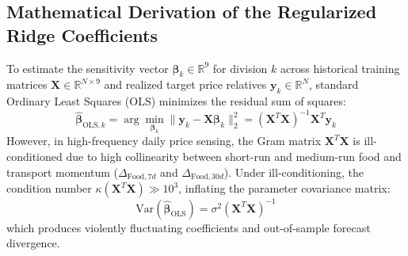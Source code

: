 \subsection{Mathematical Derivation of the Regularized Ridge Coefficients}
\hs To estimate the sensitivity vector $\boldsymbol{\beta}_k \in \mathbb{R}^9$ for division $k$ across historical training matrices $\mathbf{X} \in \mathbb{R}^{N \times 9}$ and realized target price relatives $\mathbf{y}_k \in \mathbb{R}^N$, standard Ordinary Least Squares (OLS) minimizes the residual sum of squares:
\begin{equation}
    \hat{\boldsymbol{\beta}}_{\text{OLS}, k} = \arg\min_{\boldsymbol{\beta}_k} \|\mathbf{y}_k - \mathbf{X}\boldsymbol{\beta}_k\|_2^2 = (\mathbf{X}^T \mathbf{X})^{-1} \mathbf{X}^T \mathbf{y}_k
\end{equation}
However, in high-frequency daily price sensing, the Gram matrix $\mathbf{X}^T \mathbf{X}$ is ill-conditioned due to high collinearity between short-run and medium-run food and transport momentum ($\Delta_{\text{Food}, 7d}$ and $\Delta_{\text{Food}, 30d}$). Under ill-conditioning, the condition number $\kappa(\mathbf{X}^T \mathbf{X}) \gg 10^3$, inflating the parameter covariance matrix:
\begin{equation}
    \text{Var}(\hat{\boldsymbol{\beta}}_{\text{OLS}}) = \sigma^2 (\mathbf{X}^T \mathbf{X})^{-1}
\end{equation}
which produces violently fluctuating coefficients and out-of-sample forecast divergence.

